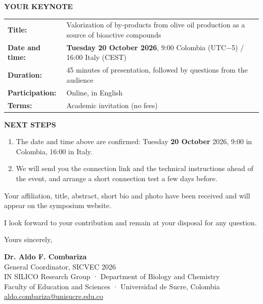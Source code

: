 \documentclass[11pt,a4paper]{article}
\begin{document}
\vspace{0.1cm}

\noindent
\textbf{YOUR KEYNOTE}

\begin{tabular}{ll}
\textbf{Title:} & \parbox[t]{13cm}{Valorization of by-products from olive oil production as a source of bioactive compounds} \\
\textbf{Date and time:} & \textbf{Tuesday 20 October 2026}, 9:00 Colombia (UTC$-$5) / 16:00 Italy (CEST) \\
\textbf{Duration:} & 45 minutes of presentation, followed by questions from the audience \\
\textbf{Participation:} & Online, in English \\
\textbf{Terms:} & Academic invitation (no fees) \\
\end{tabular}

\vspace{0.1cm}

\noindent
\textbf{NEXT STEPS}

\begin{enumerate}
  \item The date and time above are confirmed: Tuesday \textbf{20 October} 2026, 9:00 in Colombia, 16:00 in Italy.
  \item We will send you the connection link and the technical instructions ahead of the event, and arrange a short connection test a few days before.
\end{enumerate}

Your affiliation, title, abstract, short bio and photo have been received and will appear on the symposium website.

I look forward to your contribution and remain at your disposal for any question.

\vspace{0.15cm}

Yours sincerely,

\vspace{0.15cm}

\textbf{Dr. Aldo F. Combariza}\\
General Coordinator, SICVEC 2026\\
IN SILICO Research Group · Department of Biology and Chemistry\\
Faculty of Education and Sciences · Universidad de Sucre, Colombia\\
\href{mailto:aldo.combariza@unisucre.edu.co}{aldo.combariza@unisucre.edu.co}
\end{document}

